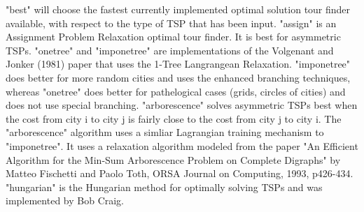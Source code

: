 "best" will choose the fastest currently implemented optimal solution tour
finder available, with respect to the type of TSP that has been input.
"assign" is an Assignment Problem Relaxation optimal tour finder.  It is
best for asymmetric TSPs.  "onetree" and "imponetree" are implementations
of the Volgenant and Jonker (1981) paper that uses the 1-Tree Langrangean
Relaxation.  "imponetree" does better for more random cities and uses
the enhanced branching techniques, whereas "onetree" does better for
pathelogical cases (grids, circles of cities) and does not use special
branching.  "arborescence" solves asymmetric TSPs best when the cost
from city i to city j is fairly close to the cost from city j to city i.
The "arborescence" algorithm uses a simliar Lagrangian training mechanism
to "imponetree".  It uses a relaxation algorithm modeled from the paper
"An Efficient Algorithm for the Min-Sum Arborescence Problem on Complete
Digraphs" by Matteo Fischetti and Paolo Toth, ORSA Journal on Computing,
1993, p426-434.  "hungarian" is the Hungarian method for optimally solving
TSPs and was implemented by Bob Craig.

